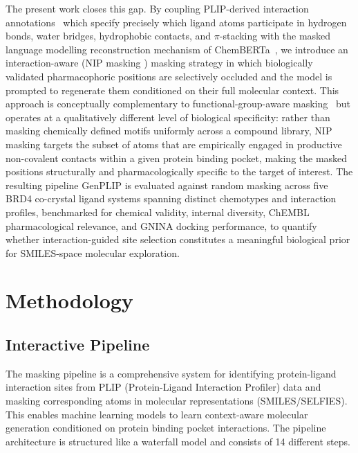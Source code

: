 \documentclass[a4paper,12pt]{article}
\begin{document}
The present work closes this gap. By coupling PLIP-derived interaction 
annotations~\cite{salentin2015plip, Adasme2021} which specify precisely which ligand 
atoms participate in hydrogen bonds, water bridges, hydrophobic contacts, and 
$\pi$-stacking with the masked language modelling reconstruction mechanism of 
ChemBERTa~\cite{chithrananda2020chemberta}, we introduce an interaction-aware (NIP masking ) 
masking strategy in which biologically validated pharmacophoric positions are selectively 
occluded and the model is prompted to regenerate them conditioned on their full molecular 
context. This approach is conceptually complementary to functional-group-aware 
masking~\cite{peng2025mlmfg} but operates at a qualitatively different level of 
biological specificity: rather than masking chemically defined motifs uniformly across a 
compound library, NIP  masking targets the subset of atoms that are empirically engaged in 
productive non-covalent contacts within a given protein binding pocket, making the masked 
positions structurally and pharmacologically specific to the target of interest. The 
resulting pipeline GenPLIP is evaluated against random masking across five BRD4 
co-crystal ligand systems spanning distinct chemotypes and interaction profiles, 
benchmarked for chemical validity, internal diversity, ChEMBL pharmacological relevance, 
and GNINA docking performance, to quantify whether interaction-guided site selection 
constitutes a meaningful biological prior for SMILES-space molecular exploration.








\section{Methodology}
\subsection{Interactive Pipeline}

The masking pipeline is a comprehensive system for identifying protein-ligand interaction sites from PLIP (Protein-Ligand Interaction Profiler) data and masking corresponding atoms in molecular representations (SMILES/SELFIES). This enables machine learning models to learn context-aware molecular generation conditioned on protein binding pocket interactions. The pipeline architecture is structured like a waterfall model and consists of 14 different steps.
\end{document}
